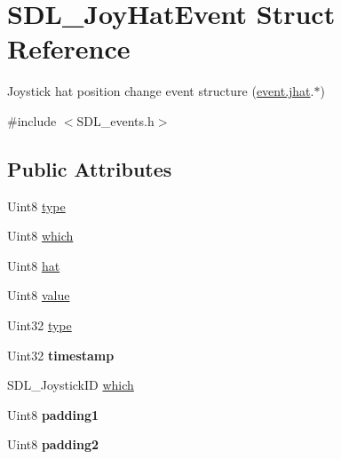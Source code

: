 \hypertarget{structSDL__JoyHatEvent}{\section{S\+D\+L\+\_\+\+Joy\+Hat\+Event Struct Reference}
\label{structSDL__JoyHatEvent}
}


Joystick hat position change event structure (\hyperlink{unionSDL__Event_a421b40e0f8e01f181c8d5548cff1dd1d}{event.\+jhat}.$\ast$)  




{\ttfamily \#include $<$S\+D\+L\+\_\+events.\+h$>$}

\subsection*{Public Attributes}
\begin{DoxyCompactItemize}
\item 
Uint8 \hyperlink{structSDL__JoyHatEvent_ac583dafab46c44354e210a542aff57cc}{type}
\item 
Uint8 \hyperlink{structSDL__JoyHatEvent_ac9d9bb179f9116d16b3da47cacd74b55}{which}
\item 
Uint8 \hyperlink{structSDL__JoyHatEvent_ab1b54a6d1091e583e856f86b5af1e2f6}{hat}
\item 
Uint8 \hyperlink{structSDL__JoyHatEvent_a52b179a34407449941b61d988ca72ef4}{value}
\item 
Uint32 \hyperlink{structSDL__JoyHatEvent_ac583dafab46c44354e210a542aff57cc}{type}
\item 
\hypertarget{structSDL__JoyHatEvent_ade58ecb3e75aad4ef9809f040519a021}{Uint32 {\bfseries timestamp}}\label{structSDL__JoyHatEvent_ade58ecb3e75aad4ef9809f040519a021}

\item 
S\+D\+L\+\_\+\+Joystick\+I\+D \hyperlink{structSDL__JoyHatEvent_ac9d9bb179f9116d16b3da47cacd74b55}{which}
\item 
\hypertarget{structSDL__JoyHatEvent_afbe72b6702cf7f70ccbe206737ab2e49}{Uint8 {\bfseries padding1}}\label{structSDL__JoyHatEvent_afbe72b6702cf7f70ccbe206737ab2e49}

\item 
\hypertarget{structSDL__JoyHatEvent_adaca3e99773130ae456690ba83feb420}{Uint8 {\bfseries padding2}}\label{structSDL__JoyHatEvent_adaca3e99773130ae456690ba83feb420}

\end{DoxyCompactItemize}



